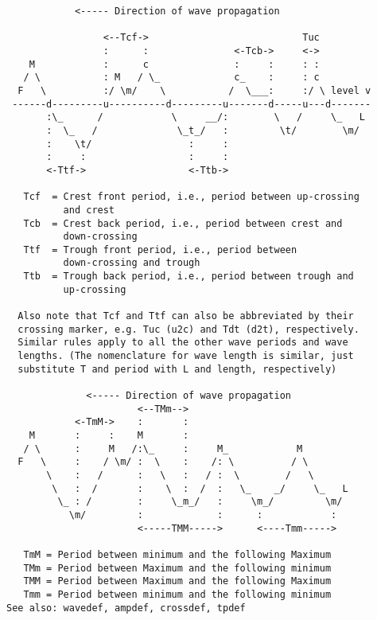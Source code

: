 \newpage
{\small\begin{verbatim}
            <----- Direction of wave propagation

                 <--Tcf->                           Tuc
                 :      :               <-Tcb->     <->
    M            :      c               :     :     : :
   / \           : M   / \_             c_    :     : c
  F   \          :/ \m/    \           /  \___:     :/ \ level v
 ------d---------u----------d---------u-------d-----u---d-------
       :\_      /            \     __/:        \   /     \_   L
       :  \_   /              \_t_/   :         \t/        \m/
       :    \t/                 :     :
       :     :                  :     :
       <-Ttf->                  <-Ttb->

   Tcf  = Crest front period, i.e., period between up-crossing
          and crest
   Tcb  = Crest back period, i.e., period between crest and
          down-crossing
   Ttf  = Trough front period, i.e., period between
          down-crossing and trough
   Ttb  = Trough back period, i.e., period between trough and
          up-crossing

  Also note that Tcf and Ttf can also be abbreviated by their
  crossing marker, e.g. Tuc (u2c) and Tdt (d2t), respectively.
  Similar rules apply to all the other wave periods and wave
  lengths. (The nomenclature for wave length is similar, just
  substitute T and period with L and length, respectively)

              <----- Direction of wave propagation
                       <--TMm-->
            <-TmM->    :       :
    M       :     :    M       :
   / \      :     M   /:\_     :     M_            M
  F   \     :    / \m/ :  \    :    /: \          / \
       \    :   /      :   \   :   / :  \        /   \
        \   :  /       :    \  :  /  :   \_    _/     \_   L
         \_ : /        :     \_m_/   :     \m_/         \m/
           \m/         :             :      :            :
                       <-----TMM----->      <----Tmm----->

   TmM = Period between minimum and the following Maximum
   TMm = Period between Maximum and the following minimum
   TMM = Period between Maximum and the following Maximum
   Tmm = Period between minimum and the following minimum
See also: wavedef, ampdef, crossdef, tpdef
\end{verbatim}
  }

